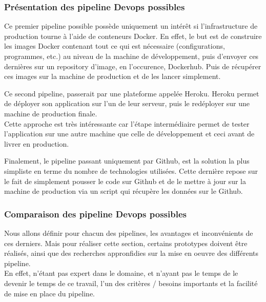 \documentclass[
    iai, %
    il, %
]{heig-tb}
\begin{document}
\subsubsection{Présentation des pipeline Devops possibles}


Ce premier pipeline possible possède uniquement un intérêt si l'infrastructure de production tourne
à l'aide de conteneurs Docker. En effet, le but est de construire les images Docker contenant tout
ce qui est nécessaire (configurations, programmes, etc.) au niveau de la machine de développement,
puis d'envoyer ces dernières sur un repository d'image, en l'occurence, Dockerhub. Puis de
récupérer ces images sur la machine de production et de les lancer simplement.

Ce second pipeline, passerait par une plateforme appelée Heroku. Heroku permet de déployer son application sur l'un de leur serveur, puis le redéployer sur une machine de production finale.\\
Cette approche est très intéressante car l'étape intermédiaire permet de tester l'application sur une autre machine que celle de développement et ceci avant de livrer en production.

Finalement, le pipeline passant uniquement par Github, est la solution la plus simpliste en terme du nombre de technologies utilisées. Cette dernière repose sur le fait de simplement pousser le code sur Github et de le mettre à jour sur la machine de production via un script qui récupère les données sur le Github.

\subsubsection{Comparaison des pipeline Devops possibles}
Nous allons définir pour chacun des pipelines, les avantages et inconvénients de ces derniers.
Mais pour réaliser cette section, certains prototypes doivent être réalisés, ainsi que des recherches appronfidies sur la mise en oeuvre des différents pipeline.\\
En effet, n'étant pas expert dans le domaine, et n'ayant pas le temps de le devenir le temps de ce travail, l'un des critères / besoins importants et la facilité de mise en place du pipeline.
\end{document}
